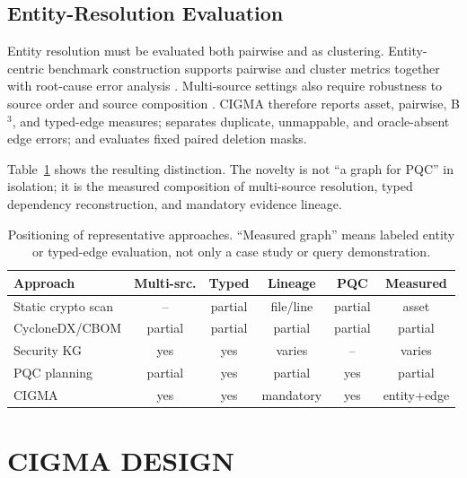 \documentclass[a4paper,twoside]{article}
\newcommand{\cigma}{CIGMA\xspace}
\begin{document}
\subsection{Entity-Resolution Evaluation}

Entity resolution must be evaluated both pairwise and as clustering. Entity-centric benchmark construction supports pairwise and cluster metrics together with root-cause error analysis \cite{binette2024entity,binette2023ereval}. Multi-source settings also require robustness to source order and source composition \cite{saeedi2020incremental}. \cigma therefore reports asset, pairwise, B$^3$, and typed-edge measures; separates duplicate, unmappable, and oracle-absent edge errors; and evaluates fixed paired deletion masks.

Table~\ref{tab:positioning} shows the resulting distinction. The novelty is not ``a graph for PQC'' in isolation; it is the measured composition of multi-source resolution, typed dependency reconstruction, and mandatory evidence lineage.

\begin{table}[t]
\caption{Positioning of representative approaches. ``Measured graph'' means labeled entity or typed-edge evaluation, not only a case study or query demonstration.}
\label{tab:positioning}
\centering
\small
\setlength{\tabcolsep}{4pt}
\begin{tabular}{@{}lccccc@{}}
\toprule
Approach & Multi-src. & Typed & Lineage & PQC & Measured \\
\midrule
Static crypto scan \cite{rahaman2019cryptoguard,nather2026hidden} & -- & partial & file/line & partial & asset \\
CycloneDX/CBOM \cite{hess2026anatomy,bogli2026bfcbom} & partial & partial & partial & partial & partial \\
Security KG \cite{sikos2023cybersecurity,mitra2021provenance} & yes & yes & varies & -- & varies \\
PQC planning \cite{hasan2024framework,sharma2026dependency} & partial & yes & partial & yes & partial \\
\cigma & yes & yes & mandatory & yes & entity+edge \\
\bottomrule
\end{tabular}
\end{table}

\section{\uppercase{CIGMA Design}}
\label{sec:design}
\end{document}
